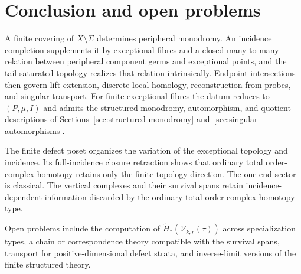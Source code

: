 \documentclass[11pt]{article}
\theoremstyle{plain}
\theoremstyle{definition}
\begin{document}
\section{Conclusion and open problems}
\label{sec:conclusion}

A finite covering of $X\setminus\Sigma$ determines peripheral monodromy.  An incidence
completion supplements it by exceptional fibres and a closed many-to-many relation between peripheral
component germs and exceptional points, and the tail-saturated topology realizes that relation
intrinsically.  Endpoint intersections then govern lift extension, discrete local homology,
reconstruction from probes, and singular transport.  For finite exceptional fibres the datum reduces
to $(P,\mu,I)$ and admits the structured monodromy, automorphism, and quotient descriptions of
Sections~\ref{sec:structured-monodromy} and~\ref{sec:singular-automorphisms}.

The finite defect poset organizes the variation of the exceptional topology and incidence.  Its
full-incidence closure retraction shows that ordinary total order-complex homotopy retains only the
finite-topology direction.  The one-end sector is classical.  The vertical complexes and their survival spans
retain incidence-dependent information discarded by the ordinary total order-complex homotopy type.

Open problems include the computation of $\widetilde H_*(\mathcal V_{k,r}(\tau))$ across
specialization types, a chain or correspondence theory compatible with the survival spans, transport
for positive-dimensional defect strata, and inverse-limit versions of the finite structured theory.



\end{document}
